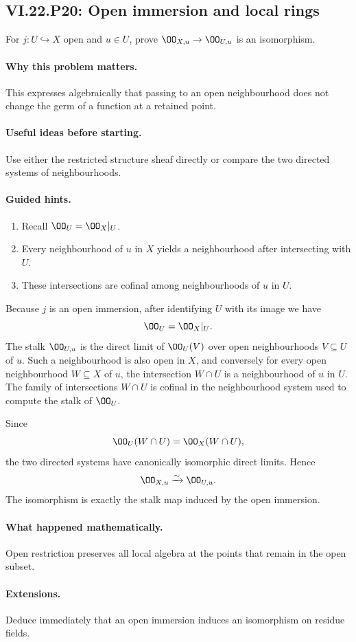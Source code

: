 \subsection*{VI.22.P20: Open immersion and local rings}
\begin{problem}\label{prob:vi22-p20}
For $j:U\hookrightarrow X$ open and $u\in U$, prove $\OO_{X,u}\to\OO_{U,u}$ is an isomorphism.
\end{problem}

\ifdefined\FullProblemDossiers
\paragraph{Why this problem matters.}
This expresses algebraically that passing to an open neighbourhood does not change the germ of a function at a retained point.

\paragraph{Useful ideas before starting.}
Use either the restricted structure sheaf directly or compare the two directed systems of neighbourhoods.

\paragraph{Guided hints.}
\begin{enumerate}
\item Recall $\OO_U=\OO_X|_U$.
\item Every neighbourhood of $u$ in $X$ yields a neighbourhood after intersecting with $U$.
\item These intersections are cofinal among neighbourhoods of $u$ in $U$.
\end{enumerate}

\begin{solution}
Because $j$ is an open immersion, after identifying $U$ with its image we have
\[
 \OO_U=\OO_X|_U.
\]
The stalk $\OO_{U,u}$ is the direct limit of $\OO_U(V)$ over open neighbourhoods
$V\subseteq U$ of $u$.  Such a neighbourhood is also open in $X$, and conversely for every
open neighbourhood $W\subseteq X$ of $u$, the intersection $W\cap U$ is a neighbourhood of
$u$ in $U$.  The family of intersections $W\cap U$ is cofinal in the neighbourhood system
used to compute the stalk of $\OO_U$.

Since
\[
 \OO_U(W\cap U)=\OO_X(W\cap U),
\]
the two directed systems have canonically isomorphic direct limits.  Hence
\[
 \OO_{X,u}\xrightarrow{\sim}\OO_{U,u}.
\]
The isomorphism is exactly the stalk map induced by the open immersion.
\end{solution}

\paragraph{What happened mathematically.}
Open restriction preserves all local algebra at the points that remain in the open subset.

\paragraph{Extensions.}
Deduce immediately that an open immersion induces an isomorphism on residue fields.
\fi
